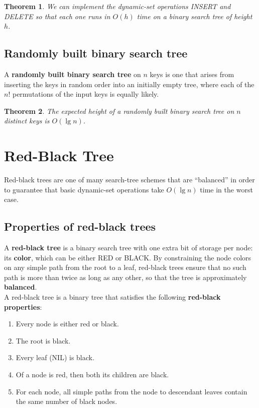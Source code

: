 \documentclass[12pt]{article}
\newtheorem{theorem}{Theorem}
\begin{document}
\begin{theorem}
  We can implement the dynamic-set operations INSERT and DELETE so that each one runs in $O(h)$ time on a binary search tree of height $h$.
\end{theorem}

\subsection{Randomly built binary search tree}

A \textbf {randomly built binary search tree} on $n$ keys is one that arises from inserting the keys in random order into an initially empty tree, where each of the $n!$ permutations of the input keys is equally likely. 

\begin{theorem}
  The expected height of a randomly built binary search tree on $n$ distinct keys is $O(\lg n)$.
\end{theorem}

\section{Red-Black Tree}

Red-black trees are one of many search-tree schemes that are ``balanced'' in order to guarantee that basic dynamic-set operations take $O(\lg n)$ time in the worst case.

\subsection{Properties of red-black trees}

A \textbf {red-black tree} is a binary search tree with one extra bit of storage per node: its \textbf {color}, which can be either RED or BLACK. By constraining the node colors on any simple path from the root to a leaf, red-black trees ensure that no such path is more than twice as long as any other, so that the tree is approximately \textbf {balanced}. \\

A red-black tree is a binary tree that satisfies the following \textbf {red-black properties}:
\begin{enumerate}
  \item Every node is either red or black.
  \item The root is black.
  \item Every leaf (NIL) is black.
  \item Of a node is red, then both its children are black.
  \item For each node, all simple paths from the node to descendant leaves contain the same number of black nodes.
\end{enumerate}
\end{document}
